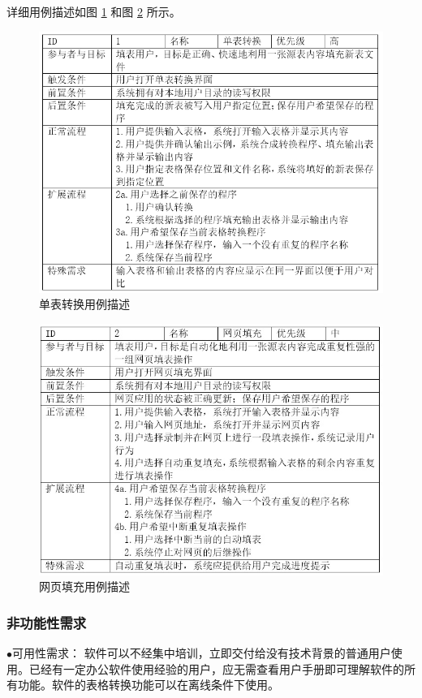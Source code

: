 \documentclass[design, pageheader]{njubachelor}
\begin{document}
详细用例描述如图 \ref{fig:use_case_1} 和图 \ref{fig:use_case_2} 所示。

\begin{figure}
    \includegraphics{figures/use_case1.jpg}
    \caption{单表转换用例描述}
    \label{fig:use_case_1}
\end{figure}

\begin{figure}
    \includegraphics{figures/use_case2.jpg}
    \caption{网页填充用例描述}
    \label{fig:use_case_2}
\end{figure}

\subsubsection{非功能性需求}
$\bullet$可用性需求：
软件可以不经集中培训，立即交付给没有技术背景的普通用户使用。已经有一定办公软件使用经验的用户，应无需查看用户手册即可理解软件的所有功能。软件的表格转换功能可以在离线条件下使用。
\end{document}
